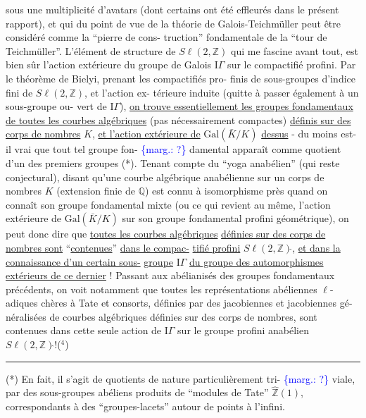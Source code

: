 \documentclass[11pt]{article}
\newcommand{\margin}[1]{\textcolor{blue}{\{\textsf{marg.:} #1\}}}
\newcommand{\uline}[1]{\underline{#1}}
\begin{document}
sous une multiplicité d'avatars (dont certains ont été effleurés
dans le présent rapport), et qui du point de vue de la théorie de
Galois-Teichmüller peut être considéré comme la ``pierre de cons-%
truction'' fondamentale de la ``tour de Teichmüller''. L'élément de
structure de $S\ell(2,\mathbb{Z})$ qui me fascine avant tout, est bien sûr
l'action extérieure du groupe de Galois $\mathrm{I}\!\Gamma$ sur le compactifié
profini. Par le théorème de Bielyi, prenant les compactifiés pro-%
finis de sous-groupes d'indice fini de $S\ell(2,\mathbb{Z})$, et l'action ex-%
térieure induite (quitte à passer également à un sous-groupe ou-%
vert de $\mathrm{I}\!\Gamma$), \uline{on trouve essentiellement les groupes fondamentaux}
\uline{de toutes les courbes algébriques} (pas nécessairement compactes)
\uline{définis sur des corps de nombres} $K$, \uline{et l'action extérieure de}
$\mathrm{Gal}(\bar{K}/K)$ \uline{dessus} - du moins est-il vrai que tout tel groupe fon-%
\margin{?} damental apparaît comme quotient d'un des premiers groupes (*).
Tenant compte du ``yoga anabélien'' (qui reste conjectural), disant
qu'une courbe algébrique anabélienne sur un corps de nombres $K$
(extension finie de $\mathbb{Q}$) est connu à isomorphisme près quand on
connaît son groupe fondamental mixte (ou ce qui revient au même,
l'action extérieure de $\mathrm{Gal}(\bar{K}/K)$ sur son groupe fondamental profini
géométrique), on peut donc dire que \uline{toutes les courbes algébriques}
\uline{définies sur des corps de nombres sont} ``\uline{contenues}'' \uline{dans le compac-}%
\uline{tifié profini} $S\ell(2,\mathbb{Z})\hat{}$, \uline{et dans la connaissance d'un certain sous-}%
\uline{groupe} $\mathrm{I}\!\Gamma$ \uline{du groupe des automorphismes extérieurs de ce dernier} !
Passant aux abélianisés des groupes fondamentaux précédents, on voit
notamment que toutes les représentations abéliennes $\ell$-adiques chères
à Tate et consorts, définies par des jacobiennes et jacobiennes gé-%
néralisées de courbes algébriques définies sur des corps de nombres,
sont contenues dans cette seule action de $\mathrm{I}\!\Gamma$ sur le groupe profini
anabélien $S\ell(2,\mathbb{Z})\hat{}$!($^{4}$)

\rule{5cm}{0.4pt}

(*) En fait, il s'agit de quotients de nature particulièrement tri-%
\margin{?} viale, par des sous-groupes abéliens produits de ``modules de Tate''
$\hat{\mathbb{Z}}(1)$, correspondants à des ``groupes-lacets'' autour de points à l'infini.
\end{document}
